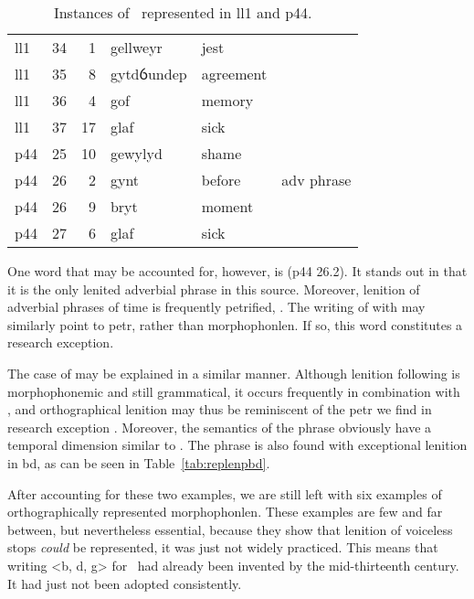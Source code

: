 \begin{table}[h]
  \centering
  \begin{tabular}{lddwql}
    \toprule
     &  &  &  &  &  \\
    \midrule
    \acrshort{ll1} & 34 & 1 & gellweyr & jest &  \\
    \acrshort{ll1} & 35 & 8 & gytdỽundep & agreement &  \\
    \acrshort{ll1} & 36 & 4 & gof & memory &  \\
    \acrshort{ll1} & 37 & 17 & glaf & sick &  \\
    \acrshort{p44} & 25 & 10 & gewylyd & shame &  \\
    \acrshort{p44} & 26 & 2 & gynt & before & adv phrase \\
    \acrshort{p44} & 26 & 9 & bryt & moment &  \\
    \acrshort{p44} & 27 & 6 & glaf & sick &  \\
    \bottomrule
  \end{tabular}%
  \caption{Instances of \lT\ represented in \acrshort{ll1} and \acrshort{p44}.}
  \label{tab:ltrepll1p44}
\end{table}

One word that may be accounted for, however, is  (\gls{p44} 26.2).
It stands out in that it is the only lenited adverbial phrase in this source.
Moreover, lenition of adverbial phrases of time is frequently petrified, \eg {}.
The writing of  with  may similarly point to \gls{petr}, rather than \gls{morphophonlen}.
If so, this word constitutes a research exception.

The case of  may be explained in a similar manner.
Although lenition following  is morphophonemic and still grammatical, it occurs frequently in combination with , and orthographical lenition may thus be reminiscent of the \gls{petr} we find in research exception .
Moreover, the semantics of the phrase obviously have a temporal dimension similar to .
The phrase  is also found with exceptional lenition in \gls{bd}, as can be seen in Table~\ref{tab:replenpbd}.

After accounting for these two examples, we are still left with six examples of orthographically represented \gls{morphophonlen}.
These examples are few and far between, but nevertheless essential, because they show that lenition of voiceless stops \emph{could} be represented, it was just not widely practiced.
This means that writing <b, d, g> for \lT\ had already been invented by the mid-thirteenth century.
It had just not been adopted consistently.


